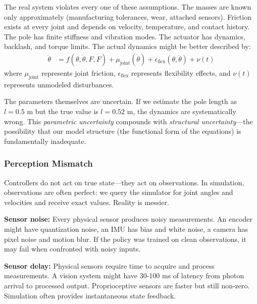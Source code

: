 The real system violates every one of these assumptions. The masses are known only approximately (manufacturing tolerances, wear, attached sensors). Friction exists at every joint and depends on velocity, temperature, and contact history. The pole has finite stiffness and vibration modes. The actuator has dynamics, backlash, and torque limits. The actual dynamics might be better described by:
\begin{align}
\ddot{\theta} &= f(\theta, \dot{\theta}, F, \dot{F}) + \mu_{\text{joint}}(\dot{\theta}) + \epsilon_{\text{flex}}(\theta, \ddot{\theta}) + \nu(t)
\label{eq:cartpole_real}
\end{align}
where $\mu_{\text{joint}}$ represents joint friction, $\epsilon_{\text{flex}}$ represents flexibility effects, and $\nu(t)$ represents unmodeled disturbances.

The parameters themselves are uncertain. If we estimate the pole length as $l = 0.5$ m but the true value is $l = 0.52$ m, the dynamics are systematically wrong. This \textit{parametric uncertainty} compounds with \textit{structural uncertainty}---the possibility that our model structure (the functional form of the equations) is fundamentally inadequate.


\subsubsection{Perception Mismatch}

Controllers do not act on true state---they act on observations. In simulation, observations are often perfect: we query the simulator for joint angles and velocities and receive exact values. Reality is messier.

\textbf{Sensor noise:} Every physical sensor produces noisy measurements. An encoder might have quantization noise, an IMU has bias and white noise, a camera has pixel noise and motion blur. If the policy was trained on clean observations, it may fail when confronted with noisy inputs.

\textbf{Sensor delay:} Physical sensors require time to acquire and process measurements. A vision system might have 30-100 ms of latency from photon arrival to processed output. Proprioceptive sensors are faster but still non-zero. Simulation often provides instantaneous state feedback.

